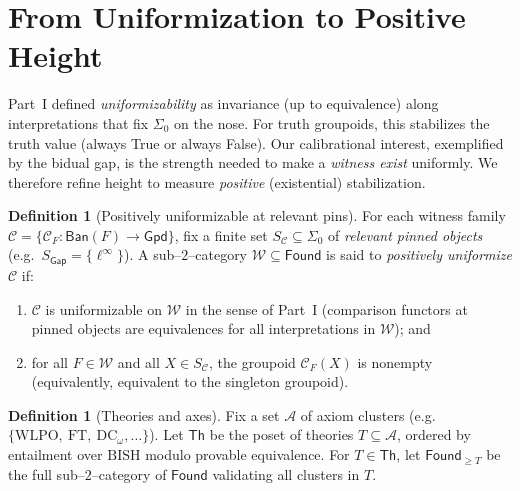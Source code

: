 \documentclass[11pt]{article}
\theoremstyle{definition}
\newtheorem{definition}[theorem]{Definition}
\theoremstyle{remark}
\newcommand{\linf}{\ell^\infty}
\newcommand{\WLPO}{\mathrm{WLPO}}
\newcommand{\BISH}{\mathrm{BISH}}
\newcommand{\Found}{\mathsf{Found}}
\newcommand{\Ban}{\mathsf{Ban}}
\newcommand{\Gpd}{\mathsf{Gpd}}
\newcommand{\SigmaZero}{\Sigma_{0}}
\begin{document}
\newcommand{\ULpos}{\mathsf{UL}^{+}}         %
\newcommand{\Frontierpos}{\partial^{+}}      %
\newcommand{\Th}{\mathsf{Th}}
\newcommand{\Axis}{\mathcal{A}}
\newcommand{\Axes}{\mathcal{B}}
\newcommand{\NatSum}{\oplus}                 %

\section{From Uniformization to Positive Height}\label{p2:sec:positive-height}

Part~I defined \emph{uniformizability} as invariance (up to equivalence) along interpretations that fix \(\SigmaZero\) on the nose. For truth groupoids, this stabilizes the truth value (always True or always False). Our calibrational interest, exemplified by the bidual gap, is the strength needed to make a \emph{witness exist} uniformly. We therefore refine height to measure \emph{positive} (existential) stabilization.

\begin{definition}[Positively uniformizable at relevant pins]\label{p2:def:pos-unif}
For each witness family \(\mathcal C=\{\mathcal C_F:\Ban(F)\to\Gpd\}\), fix a finite set
\(S_{\mathcal C}\subseteq\SigmaZero\) of \emph{relevant pinned objects}
(e.g.\ \(S_{\mathsf{Gap}}=\{\linf\}\)).
A sub--$2$--category \(\mathcal W\subseteq\Found\) is said to \emph{positively uniformize} \(\mathcal C\) if:
\begin{enumerate}
\item \(\mathcal C\) is uniformizable on \(\mathcal W\) in the sense of Part~I (comparison functors at pinned objects are equivalences for all interpretations in \(\mathcal W\)); and
\item for all \(F\in\mathcal W\) and all \(X\in S_{\mathcal C}\), the groupoid \(\mathcal C_F(X)\) is nonempty (equivalently, equivalent to the singleton groupoid).
\end{enumerate}
\end{definition}

\begin{definition}[Theories and axes]\label{p2:def:theories-axes}
Fix a set \(\Axis\) of axiom clusters (e.g.\ \(\{\WLPO,\ \mathrm{FT},\ \mathrm{DC}_\omega,\ldots\}\)).
Let \(\Th\) be the poset of theories \(T\subseteq\Axis\), ordered by entailment over \(\BISH\) modulo provable equivalence. For \(T\in\Th\), let \(\Found_{\ge T}\) be the full sub--$2$--category of \(\Found\) validating all clusters in \(T\).
\end{definition}
\end{document}
